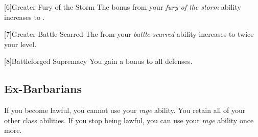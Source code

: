         [6]{Greater Fury of the Storm}
        The bonus from your \textit{fury of the storm} ability increases to .

        [7]{Greater Battle-Scarred}
        The  from your \textit{battle-scarred} ability increases to twice your level.

        [8]{Battleforged Supremacy}
        You gain a  bonus to all defenses.








    \subsection{Ex-Barbarians}
        If you become lawful, you cannot use your \textit{rage} ability.
        You retain all of your other class abilities.
        If you stop being lawful, you can use your \textit{rage} ability once more.

\newpage

